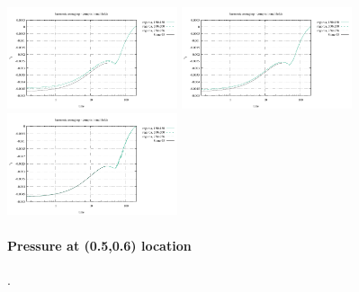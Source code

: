 \begin{center}
\includegraphics[width=5cm]{images/stokes_sphere_fs2D/point_v_arithm_pic}
\includegraphics[width=5cm]{images/stokes_sphere_fs2D/point_v_geom_pic}
\includegraphics[width=5cm]{images/stokes_sphere_fs2D/point_v_harm_pic}
\end{center}


\paragraph{Pressure at (0.5,0.6) location}.

